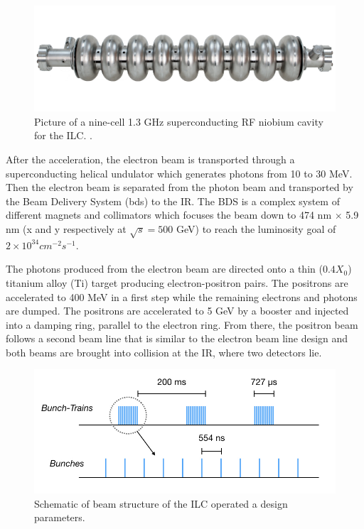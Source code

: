 \begin{figure}[htbp!]
  \centering
  \includegraphics[width=0.7\linewidth]{chap2/fig/CavityNiobium.png}
  \caption{Picture of a nine-cell 1.3 GHz superconducting RF niobium cavity for the ILC. \cite{ILC_TDR_Vol3.1}.} \label{fig:CavityNiobium}
\end{figure}

After the acceleration, the electron beam is transported through a superconducting helical undulator which generates photons from 10 to 30 MeV. Then the electron beam is separated from the photon beam and transported by the Beam Delivery System (\acrshort{bds}) to the IR. The BDS is a complex system of different magnets and collimators which focuses the beam down to 474 nm $\times$ 5.9 nm (x and y respectively at $\sqrt{s} = 500$ GeV) to reach the luminosity goal of $2 \times 10^{34} cm^{-2}s^{-1}$.

The photons produced from the electron beam are directed onto a thin ($0.4 X_0$) titanium alloy (Ti) target producing elec\-tron\--positron pairs. The positrons are accelerated to 400 MeV in a first step while the remaining electrons and photons are dumped. The positrons are accelerated to 5 GeV by a booster and injected into a damping ring, parallel to the electron ring. From there, the positron beam follows a second beam line that is similar to the electron beam line design and both beams are brought into collision at the IR, where two detectors lie.

\begin{figure}[htbp!]
  \centering
  \includegraphics[width=0.7\linewidth]{chap2/fig/BeamStructure.jpeg}
  \caption{Schematic of beam structure of the ILC operated a design parameters.} \label{fig:ILC_BeamStruct}
\end{figure}

